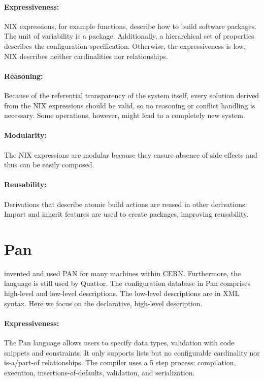 \paragraph*{Expressiveness:}
NIX expressions, for example functions, describe how to build software packages.
The unit of variability is a package.
Additionally, a hierarchical set of properties describes the configuration specification.
Otherwise, the expressiveness is low, NIX describes neither cardinalities nor relationships.

\paragraph*{Reasoning:}
Because of the referential transparency of the system itself, every solution derived from the NIX expressions should be valid, so no reasoning or conflict handling is necessary.
Some operations, however, might lead to a completely new system.

\paragraph*{Modularity:}
The NIX expressions are modular because they ensure absence of side effects and thus can be easily composed.

\paragraph*{Reusability:}
Derivations that describe atomic build actions are reused in other derivations.
Import and inherit features are used to create packages, improving reusability.



\section{Pan}

\citet{cons2002pan} invented and used PAN for many machines within CERN.
Furthermore, the language is still used by Quattor.
The configuration database in Pan comprises high-level and low-level descriptions.
The low-level descriptions are in XML syntax.
Here we focus on the declarative, high-level description.

\paragraph*{Expressiveness:}
The Pan language allows users to specify data types, validation with code snippets and constraints.
It only supports lists but no configurable cardinality nor is-a/part-of relationships.
The compiler uses a 5 step process: compilation, execution, insertions-of-defaults, validation, and serialization.

